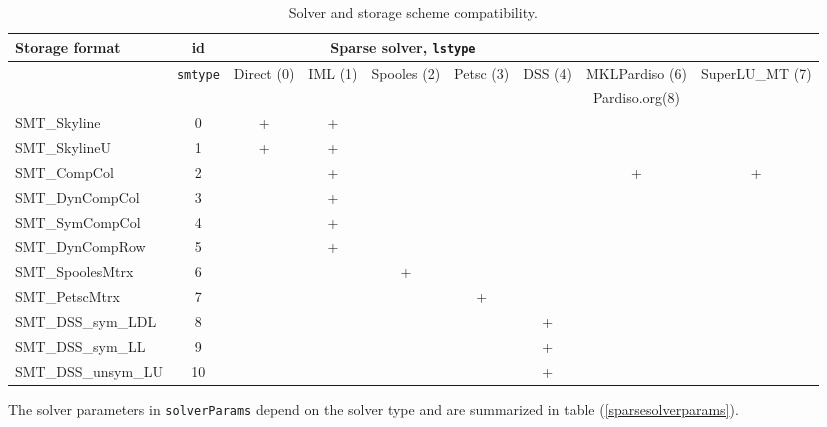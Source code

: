 \documentclass[a4paper]{report}
\newcommand{\param}[1]{\texttt{#1}} %
\begin{document}
\begin{table}[ht]
\begin{center}
\begin{tabular}{|l|c|c|c|c|c|c|c|c|}
\hline
Storage format & id & \multicolumn{5}{c|}{Sparse solver, \param{lstype}} \\
\hline
& \param{smtype} & \tiny{Direct (0)} &\tiny{IML (1)} &\tiny{Spooles (2)}& \tiny{Petsc (3)}& \tiny{DSS (4)}& \tiny{MKLPardiso (6)}& \tiny{SuperLU\_MT (7)}\\
&                &                   &               &                  &                 &               & \tiny{Pardiso.org(8)}&                       \\

\hline
\small{SMT\_Skyline}       & 0&+&+& & & & &\\
\small{SMT\_SkylineU}      & 1&+&+& & & & & \\
\small{SMT\_CompCol}       & 2& &+& & & &+&+\\
\small{SMT\_DynCompCol}    & 3& &+& & & & & \\
\small{SMT\_SymCompCol}    & 4& &+& & & & & \\
\small{SMT\_DynCompRow}    & 5& &+& & & & & \\
\small{SMT\_SpoolesMtrx}   & 6& & &+& & & & \\
\small{SMT\_PetscMtrx }    & 7& & & &+& & & \\
\small{SMT\_DSS\_sym\_LDL} & 8& & & & &+ & &\\
\small{SMT\_DSS\_sym\_LL}  & 9& & & & &+ & &\\
\small{SMT\_DSS\_unsym\_LU}&10& & & & &+ & &\\
\hline
\end{tabular}
\caption{Solver and storage scheme compatibility.}
\label{linsolvstoragecompattable}
\end{center}
\end{table}

The solver parameters in \param{solverParams} depend on the solver
type and are summarized in table (\ref{sparsesolverparams}).
\end{document}
